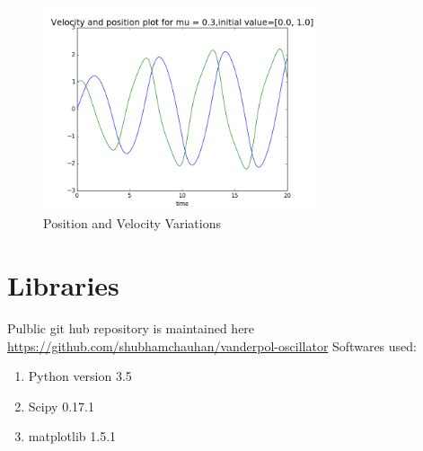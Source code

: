 \documentclass[a4paper]{article}
\begin{document}
\begin{figure}[!htbp]
\begin{center}
\includegraphics[width=8cm]{../output/position_velocity.png}
\end{center}
\caption{Position and Velocity Variations}\label{pos}
\end{figure}

\section{Libraries}
Pulblic git hub repository is maintained here \url{https://github.com/shubhamchauhan/vanderpol-oscillator} 
Softwares used:
\begin{enumerate}
\item Python version 3.5
\item Scipy 0.17.1
\item matplotlib 1.5.1
\end{enumerate}




\end{document}
